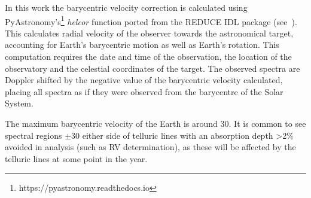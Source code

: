 In this work the barycentric velocity correction is calculated using PyAstronomy's\footnote{https://pyastronomy.readthedocs.io} \emph{helcor} function ported from the REDUCE IDL package (see~\citet[][]{piskunov_new_2002}).
This calculates radial velocity of the observer towards the astronomical target, accounting for Earth's barycentric motion as well as Earth's rotation.
This computation requires the date and time of the observation, the location of the observatory and the celestial coordinates of the target.
The observed spectra are Doppler shifted by the negative value of the barycentric velocity calculated, placing all spectra as if they were observed from the barycentre of the Solar System.

The maximum barycentric velocity of the Earth is around 30\kmps{}. It is common to see spectral regions $\pm30$\kmps{} either side of telluric lines with an absorption depth >2\% avoided in analysis (such as RV determination), as these will be affected by the telluric lines at some point in the year.
